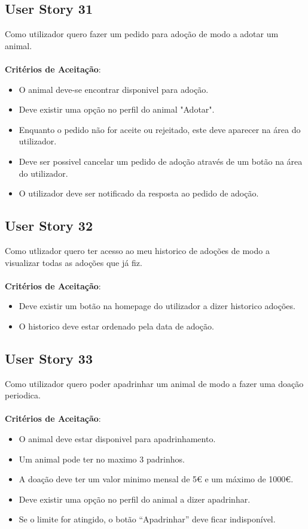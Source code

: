 \documentclass[a4paper,11pt]{article}
\begin{document}
\subsection{User Story 31}
Como utilizador quero fazer um pedido para adoção de modo a adotar um animal.\\\\
\textbf{Critérios de Aceitação}:
\begin{itemize}
  \item O animal deve-se encontrar disponivel para adoção.
  \item Deve existir uma opção no perfil do animal "Adotar".
  \item Enquanto o pedido não for aceite ou rejeitado, este deve aparecer na área do utilizador.
  \item Deve ser possivel cancelar um pedido de adoção através de um botão na área do utilizador.
  \item O utilizador deve ser notificado da resposta ao pedido de adoção.
\end{itemize}

\subsection{User Story 32}
Como utlizador quero ter acesso ao meu historico de adoções de modo a visualizar todas as adoções que já fiz.\\\\
\textbf{Critérios de Aceitação}:
\begin{itemize}
  \item Deve existir um botão na homepage do utilizador a dizer historico adoções.
  \item O historico deve estar ordenado pela data de adoção.
\end{itemize}

\subsection{User Story 33}
Como utilizador quero poder apadrinhar um animal de modo a fazer uma doação periodica.\\\\
\textbf{Critérios de Aceitação}:
\begin{itemize}
  \item O animal deve estar disponivel para apadrinhamento.
  \item Um animal pode ter no maximo 3 padrinhos.
  \item A doação deve ter um valor minimo mensal de 5€ e um máximo de 1000€.
  \item Deve existir uma opção no perfil do animal a dizer apadrinhar.
  \item Se o limite for atingido, o botão “Apadrinhar” deve ficar indisponível.
\end{itemize}
\end{document}
